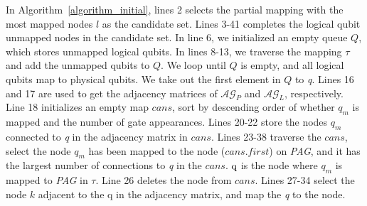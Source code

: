 \documentclass[runningheads]{llncs}
\begin{document}
	In Algorithm~\ref{algorithm_initial}, lines 2 selects the partial mapping with the most mapped nodes $l$ as the candidate set. Lines 3-41 completes the logical qubit unmapped nodes in the candidate set. In line 6, we initialized an empty queue $Q$, which stores unmapped logical qubits. In lines 8-13, we traverse the mapping $\tau$ and add the unmapped qubits to $Q$. We loop until $Q$ is empty, and all logical qubits map to physical qubits. We take out the first element in $Q$ to \textit{q}. Lines 16 and 17 are used to get the adjacency matrices of $\mathcal{AG}_{P}$ and $\mathcal{AG}_{L}$, respectively. Line 18 initializes an empty map $cans$, sort by descending order of whether $\textit{q}_\textit{m}$ is mapped and the number of gate appearances. Lines 20-22 store the nodes $\textit{q}_\textit{m}$ connected to \textit{q} in the adjacency matrix in $ cans$. Lines 23-38 traverse the $cans$, select the node $\textit{q}_\textit{m}$ has been mapped to the node ($cans.first$) on \textit{PAG}, and it has the largest number of connections to \textit{q} in the $cans$. $ \textup{q}$ is the node where $\textit{q}_\textit{m}$ is mapped to \textit{{PAG}} in $\tau$.  Line 26 deletes the node from $cans$. Lines 27-34 select the node $k$ adjacent to the \textup{q} in the adjacency matrix, and map the \textit{q} to the node.
\end{document}
